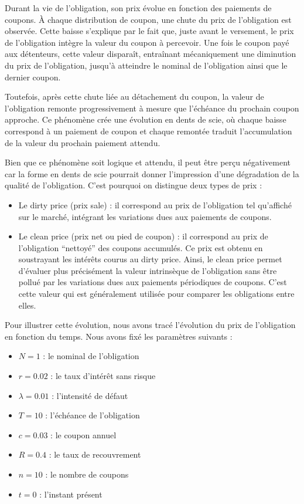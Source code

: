 \documentclass[
  letterpaper,
  DIV=11,
  numbers=noendperiod]{scrartcl}
\providecommand{\tightlist}{%
  \setlength{\itemsep}{0pt}\setlength{\parskip}{0pt}}\usepackage{longtable,booktabs,array}
\begin{document}
Durant la vie de l'obligation, son prix évolue en fonction des paiements
de coupons. À chaque distribution de coupon, une chute du prix de
l'obligation est observée. Cette baisse s'explique par le fait que,
juste avant le versement, le prix de l'obligation intègre la valeur du
coupon à percevoir. Une fois le coupon payé aux détenteurs, cette valeur
disparaît, entraînant mécaniquement une diminution du prix de
l'obligation, jusqu'à atteindre le nominal de l'obligation ainsi que le
dernier coupon.

Toutefois, après cette chute liée au détachement du coupon, la valeur de
l'obligation remonte progressivement à mesure que l'échéance du prochain
coupon approche. Ce phénomène crée une évolution en dents de scie, où
chaque baisse correspond à un paiement de coupon et chaque remontée
traduit l'accumulation de la valeur du prochain paiement attendu.

Bien que ce phénomène soit logique et attendu, il peut être perçu
négativement car la forme en dents de scie pourrait donner l'impression
d'une dégradation de la qualité de l'obligation. C'est pourquoi on
distingue deux types de prix :

\begin{itemize}
\tightlist
\item
  Le dirty price (prix sale) : il correspond au prix de l'obligation tel
  qu'affiché sur le marché, intégrant les variations dues aux paiements
  de coupons.
\item
  Le clean price (prix net ou pied de coupon) : il correspond au prix de
  l'obligation ``nettoyé'' des coupons accumulés. Ce prix est obtenu en
  soustrayant les intérêts courus au dirty price. Ainsi, le clean price
  permet d'évaluer plus précisément la valeur intrinsèque de
  l'obligation sans être pollué par les variations dues aux paiements
  périodiques de coupons. C'est cette valeur qui est généralement
  utilisée pour comparer les obligations entre elles.
\end{itemize}

Pour illustrer cette évolution, nous avons tracé l'évolution du prix de
l'obligation en fonction du temps. Nous avons fixé les paramètres
suivants :

\begin{itemize}
\tightlist
\item
  \(N = 1\) : le nominal de l'obligation
\item
  \(r = 0.02\) : le taux d'intérêt sans risque
\item
  \(\lambda = 0.01\) : l'intensité de défaut
\item
  \(T = 10\) : l'échéance de l'obligation
\item
  \(c = 0.03\) : le coupon annuel
\item
  \(R = 0.4\) : le taux de recouvrement
\item
  \(n = 10\) : le nombre de coupons
\item
  \(t = 0\) : l'instant présent
\end{itemize}
\end{document}
